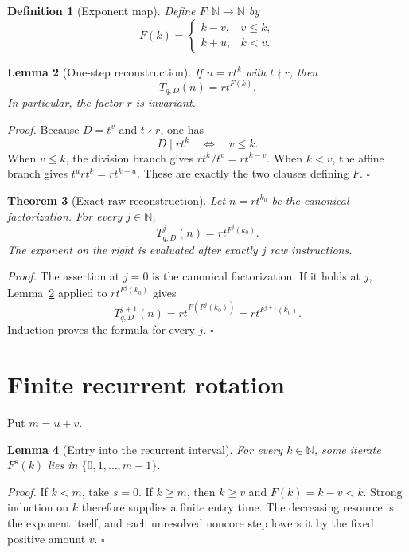 \documentclass[11pt,letterpaper]{article}
\newcommand{\N}{\mathbb{N}}
\newtheorem{theorem}{Theorem}
\newtheorem{lemma}[theorem]{Lemma}
\newtheorem{definition}[theorem]{Definition}
\newenvironment{proof}{\noindent\textit{Proof.}}{\hfill\(\square\)}
\begin{document}
\begin{definition}[Exponent map]
Define $F\colon\N\to\N$ by
\[
 F(k)=
 \begin{cases}
  k-v,&v\leq k,\\
  k+u,&k<v.
 \end{cases}
\]
\end{definition}

\begin{lemma}[One-step reconstruction]
\label{lem:one-step}
If $n=rt^k$ with $t\nmid r$, then
\[
 T_{q,D}(n)=rt^{F(k)}.
\]
In particular, the factor $r$ is invariant.
\end{lemma}

\begin{proof}
Because $D=t^v$ and $t\nmid r$, one has
\[
 D\mid rt^k\quad\Longleftrightarrow\quad v\leq k.
\]
When $v\leq k$, the division branch gives
$rt^k/t^v=rt^{k-v}$.  When $k<v$, the affine branch gives
$t^u rt^k=rt^{k+u}$.  These are exactly the two clauses defining $F$.
\end{proof}

\begin{theorem}[Exact raw reconstruction]
\label{thm:reconstruction}
Let $n=rt^{k_0}$ be the canonical factorization.  For every $j\in\N$,
\[
 T_{q,D}^{j}(n)=rt^{F^j(k_0)}.
\]
The exponent on the right is evaluated after exactly $j$ raw instructions.
\end{theorem}

\begin{proof}
The assertion at $j=0$ is the canonical factorization.  If it holds at $j$,
Lemma~\ref{lem:one-step} applied to $rt^{F^j(k_0)}$ gives
\[
 T_{q,D}^{j+1}(n)=rt^{F(F^j(k_0))}=rt^{F^{j+1}(k_0)}.
\]
Induction proves the formula for every $j$.
\end{proof}

\section{Finite recurrent rotation}

Put $m=u+v$.

\begin{lemma}[Entry into the recurrent interval]
\label{lem:entry}
For every $k\in\N$, some iterate $F^s(k)$ lies in
$\{0,1,\ldots,m-1\}$.
\end{lemma}

\begin{proof}
If $k<m$, take $s=0$.  If $k\geq m$, then $k\geq v$ and
$F(k)=k-v<k$.  Strong induction on $k$ therefore supplies a finite entry
time.  The decreasing resource is the exponent itself, and each unresolved
noncore step lowers it by the fixed positive amount $v$.
\end{proof}
\end{document}
